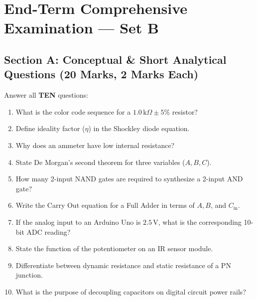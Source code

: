 \section{End-Term Comprehensive Examination --- Set B}


\subsection*{Section A: Conceptual \& Short Analytical Questions (20 Marks, 2 Marks Each)}
\noindent Answer all \textbf{TEN} questions:
\begin{enumerate}[leftmargin=1.8em, itemsep=3pt]
    \item What is the color code sequence for a $1.0\,\mathrm{k}\Omega \pm 5\%$ resistor?
    \item Define ideality factor ($\eta$) in the Shockley diode equation.
    \item Why does an ammeter have low internal resistance?
    \item State De Morgan's second theorem for three variables ($A, B, C$).
    \item How many 2-input NAND gates are required to synthesize a 2-input AND gate?
    \item Write the Carry Out equation for a Full Adder in terms of $A, B$, and $C_{\mathrm{in}}$.
    \item If the analog input to an Arduino Uno is $2.5\,\mathrm{V}$, what is the corresponding 10-bit ADC reading?
    \item State the function of the potentiometer on an IR sensor module.
    \item Differentiate between dynamic resistance and static resistance of a PN junction.
    \item What is the purpose of decoupling capacitors on digital circuit power rails?
\end{enumerate}

